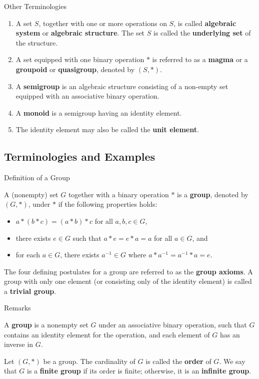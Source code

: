 \documentclass{beamer}
\begin{document}
\begin{frame}{Other Terminologies}
\begin{enumerate}
\justifying
\item A set $S$, together with one or more operations on $S$, is called \textbf{algebraic system} or \textbf{algebraic structure}. The set $S$ is called the \textbf{underlying set} of the structure.
\item A set equipped with one binary operation $*$ is referred to as a \textbf{magma} or a \textbf{groupoid} or \textbf{quasigroup}, denoted by $(S, *)$.
\item A \textbf{semigroup} is an algebraic structure consisting of a non-empty set equipped with an associative binary operation.
\item A \textbf{monoid} is a semigroup having an identity element.
\item The identity element may also be called the \textbf{unit element}.
\end{enumerate}    
\end{frame}

\subsection{Terminologies and Examples}

\begin{frame}{Definition of a Group}
\justifying
\begin{definition}
\justifying
A (nonempty) set $G$ together with a binary operation $*$ is a \textbf{group}, denoted by $(G, *)$, under $*$ if the following properties holds:
\begin{itemize}
\justifying
\item $a * (b * c) = (a * b) * c$ for all $a, b, c \in G$,
\item there exists $e \in G$ such that $a * e = e * a = a$ for all $a \in G$, and
\item for each $a \in G$, there exists $a^{-1} \in G$ where $a * a^{-1} = a^{-1} * a = e$.
\end{itemize}
\end{definition}

The four defining postulates for a group are referred to as the \textbf{group axioms}. A group with only one element (or consisting only of the identity element) is called a \textbf{trivial group}. 

\end{frame}

\begin{frame}{Remarks}
\begin{definition}[Restated]
\justifying
A \textbf{group} is a nonempty set $G$ under an associative binary operation, such that $G$ contains an identity element for the operation, and each element of $G$ has an inverse in $G$.
\end{definition}  
\pause
\begin{definition}
\justifying
Let $(G, *)$ be a group. The cardinality of $G$ is called the \textbf{order} of $G$. We say that $G$ is a \textbf{finite group} if its order is finite; otherwise, it is an \textbf{infinite group}.
\end{definition} 
\end{frame}
\end{document}
